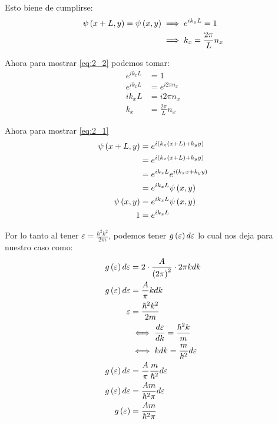 \documentclass{report}
\begin{document}
Esto biene de cumplirse:
\begin{align}
  \psi\left(x + L, y\right) = \psi\left(x, y\right) &\implies e^{ik_x L} = 1\label{eq:2_1}\\
  &\implies k_x = \frac{2\pi}{L}n_x\label{eq:2_2}
\end{align}

Ahora para mostrar \ref{eq:2_2} podemos tomar:
\begin{align*}
  e^{ik_x L} &= 1\\
  e^{ik_x L} &= e^{i2\pi n_x}\\
  ik_x L &= i2\pi n_x\\
  k_x&= \frac{2\pi}{L} n_x
\end{align*}

Ahora para mostrar \ref{eq:2_1}
\begin{align*}
  \psi\left(x + L, y\right) &= e^{i\left(k_x (x + L) + k_y y\right)}\\
  &= e^{i\left(k_x (x + L) + k_y y\right)}\\
  &= e^{ik_x L}e^{i\left(k_x x + k_y y\right)}\\
  &= e^{ik_x L}\psi\left(x, y\right)\\
  \psi\left(x, y\right)&= e^{ik_x L}\psi\left(x, y\right)\\
  1 &= e^{ik_x L}
\end{align*}

Por lo tanto al tener $\varepsilon = \frac{\hbar^2k^2}{2m}$, podemos tener $g\left(\varepsilon\right)d\varepsilon$ lo cual nos deja para nuestro caso como:
\begin{align*}
  g\left(\varepsilon\right) d\varepsilon &= 2 \cdot \frac{A}{\left(2\pi\right)^2}\cdot 2\pi k dk\\
  g\left(\varepsilon\right) d\varepsilon &= \frac{A}{\pi} k dk\\
  \varepsilon &= \frac{\hbar^2 k^2}{2 m}\\
  &\iff \frac{d\varepsilon}{d k} = \frac{\hbar^2 k}{m}\\
  &\iff k dk = \frac{m}{\hbar^2}d\varepsilon\\
  g\left(\varepsilon\right) d\varepsilon &= \frac{A}{\pi} \frac{m}{\hbar^2} d\varepsilon \\
  g\left(\varepsilon\right) d\varepsilon &= \frac{A m}{\hbar^2 \pi} d\varepsilon \\
  g\left(\varepsilon\right) &= \frac{A m}{\hbar^2 \pi} \\
\end{align*}

\section{}
\end{document}
